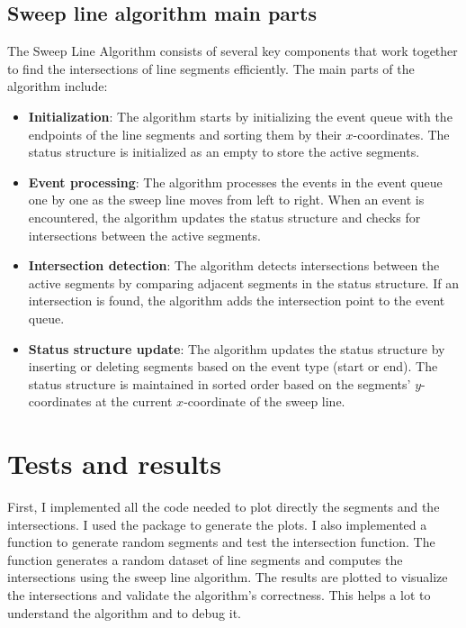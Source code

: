 \documentclass[10pt,a4paper,hidelinks]{article}
\begin{document}
\subsection{Sweep line algorithm main parts}
The Sweep Line Algorithm consists of several key components that work together to find the intersections of line segments efficiently. The main parts of the algorithm include:
\begin{itemize}
    \item \textbf{Initialization}: The algorithm starts by initializing the event queue with the endpoints of the line segments and sorting them by their $x$-coordinates. The status structure is initialized as an empty  to store the active segments.
    
    \item \textbf{Event processing}: The algorithm processes the events in the event queue one by one as the sweep line moves from left to right. When an event is encountered, the algorithm updates the status structure and checks for intersections between the active segments.
    
    \item \textbf{Intersection detection}: The algorithm detects intersections between the active segments by comparing adjacent segments in the status structure. If an intersection is found, the algorithm adds the intersection point to the event queue.
    
    \item \textbf{Status structure update}: The algorithm updates the status structure by inserting or deleting segments based on the event type (start or end). The status structure is maintained in sorted order based on the segments' $y$-coordinates at the current $x$-coordinate of the sweep line.
    
    
\end{itemize}

\section{Tests and results}
First, I implemented all the code needed to plot directly the segments and the intersections. I used the  package to generate the plots. I also implemented a function to generate random segments and test the intersection function. The function generates a random dataset of line segments and computes the intersections using the sweep line algorithm. The results are plotted to visualize the intersections and validate the algorithm's correctness. This helps a lot to understand the algorithm and to debug it.
\end{document}
